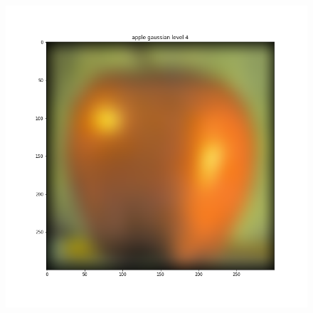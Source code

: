 \documentclass{article}
\begin{document}
\begin{figure}[!htb]
\endminipage
{}
    \includegraphics[width=\linewidth]{apple gaussian level 4.png}
\endminipage
\end{figure}
\end{document}
